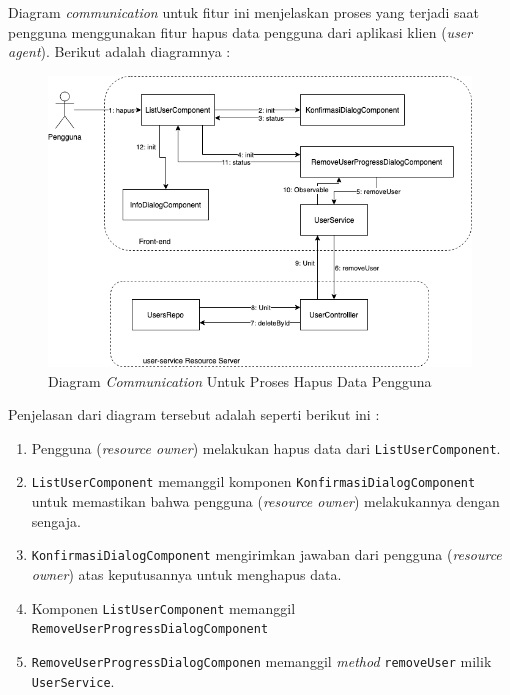 \documentclass[pdftex,12pt, oneside]{article}
\begin{document}
\begin{itemize}
	Diagram \textit{communication} untuk fitur ini menjelaskan proses yang terjadi saat pengguna menggunakan fitur hapus data pengguna dari aplikasi klien (\textit{user agent}). Berikut adalah diagramnya :
	
	\begin{figure}[H]
		\centering
		\includegraphics[width=1\textwidth]{./resources/comm-dia-hapus-user}
		\caption{Diagram \textit{Communication} Untuk Proses Hapus Data Pengguna}
		\label{fig:comm-dia-hapus-user}
	\end{figure}
	
	Penjelasan dari diagram tersebut adalah seperti berikut ini :
	
	\begin{enumerate}
		\item Pengguna (\textit{resource owner}) melakukan hapus data dari \texttt{ListUserComponent}.
		
		\item \texttt{ListUserComponent} memanggil komponen \texttt{KonfirmasiDialogComponent} untuk memastikan bahwa pengguna (\textit{resource owner}) melakukannya dengan sengaja.
		
		\item \texttt{KonfirmasiDialogComponent} mengirimkan jawaban dari pengguna (\textit{resource owner}) atas keputusannya untuk menghapus data.
		
		\item Komponen \texttt{ListUserComponent} memanggil \texttt{RemoveUserProgressDialogComponent}
		
		\item \texttt{RemoveUserProgressDialogComponen} memanggil \textit{method} \texttt{removeUser} milik \texttt{UserService}.
		

\end{enumerate}
\end{itemize}
\end{document}
